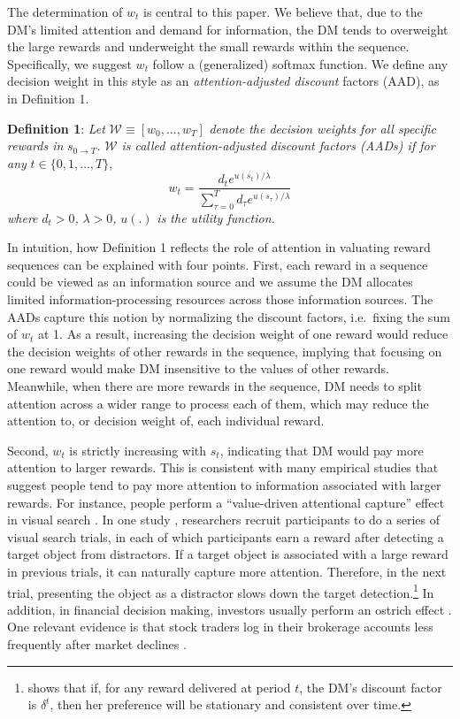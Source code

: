 \documentclass[
  12pt,
]{article}
\begin{document}
The determination of \(w_t\) is central to this paper. We believe that,
due to the DM's limited attention and demand for information, the DM
tends to overweight the large rewards and underweight the small rewards
within the sequence. Specifically, we suggest \(w_t\) follow a
(generalized) softmax function. We define any decision weight in this
style as an \emph{attention-adjusted discount} factors (AAD), as in
Definition 1.

\noindent \textbf{Definition 1}: \emph{Let}
\(\mathcal{W}\equiv[w_0,...,w_T]\) \emph{denote the decision weights for
all specific rewards in} \(s_{0\rightarrow T}\)\emph{.} \(\mathcal{W}\)
\emph{is called attention-adjusted discount factors (AADs) if for any}
\(t\in\{0,1,…,T\}\),\[\tag{1}
w_t = \frac{d_te^{u(s_t)/\lambda}}{\sum_{\tau=0}^T d_\tau e^{u(s_\tau)/\lambda}} 
\]\emph{where} \(d_t > 0\)\emph{,} \(\lambda>0\)\emph{,} \(u(.)\)
\emph{is the utility function.}

In intuition, how Definition 1 reflects the role of attention in
valuating reward sequences can be explained with four points. First,
each reward in a sequence could be viewed as an information source and
we assume the DM allocates limited information-processing resources
across those information sources. The AADs capture this notion by
normalizing the discount factors, i.e.~fixing the sum of \(w_t\) at 1.
As a result, increasing the decision weight of one reward would reduce
the decision weights of other rewards in the sequence, implying that
focusing on one reward would make DM insensitive to the values of other
rewards. Meanwhile, when there are more rewards in the sequence, DM
needs to split attention across a wider range to process each of them,
which may reduce the attention to, or decision weight of, each
individual reward.

Second, \(w_t\) is strictly increasing with \(s_t\), indicating that DM
would pay more attention to larger rewards. This is consistent with many
empirical studies that suggest people tend to pay more attention to
information associated with larger rewards. For instance, people perform
a ``value-driven attentional capture'' effect in visual search
\citep{della2009learning, hickey2010reward, anderson2011value, chelazzi2013rewards, jahfari2017sensitivity}.
In one study \citep{hickey2010reward}, researchers recruit participants
to do a series of visual search trials, in each of which participants
earn a reward after detecting a target object from distractors. If a
target object is associated with a large reward in previous trials, it
can naturally capture more attention. Therefore, in the next trial,
presenting the object as a distractor slows down the target
detection.\footnote{\citet{strotz1955myopia} shows that if, for any
  reward delivered at period \(t\), the DM's discount factor is
  \(\delta^t\), then her preference will be stationary and consistent
  over time.} In addition, in financial decision making, investors
usually perform an ostrich effect
\citep{galai2006ostrich, karlsson2009ostrich}. One relevant evidence is
that stock traders log in their brokerage accounts less frequently after
market declines \citep{sicherman2016financial}.
\end{document}
